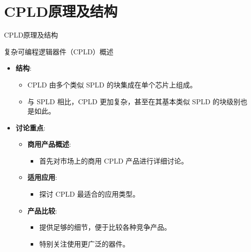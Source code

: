 \section{CPLD原理及结构}

\begin{frame}{CPLD原理及结构}
\begin{block}{复杂可编程逻辑器件（CPLD）概述}
\begin{itemize}
\tightlist
\item
    \textbf{结构}:

    \begin{itemize}
    \tightlist
    \item
    CPLD 由多个类似 SPLD 的块集成在单个芯片上组成。
    \item
    与 SPLD 相比，CPLD 更加复杂，甚至在其基本类似 SPLD
    的块级别也是如此。
    \end{itemize}
\item
    \textbf{讨论重点}:

    \begin{itemize}
    \tightlist
    \item
    \textbf{商用产品概述}:

    \begin{itemize}
    \tightlist
    \item
        首先对市场上的商用 CPLD 产品进行详细讨论。
    \end{itemize}
    \item
    \textbf{适用应用}:

    \begin{itemize}
    \tightlist
    \item
        探讨 CPLD 最适合的应用类型。
    \end{itemize}
    \item
    \textbf{产品比较}:

    \begin{itemize}
    \tightlist
    \item
        提供足够的细节，便于比较各种竞争产品。
    \item
        特别关注使用更广泛的器件。
    \end{itemize}
    \end{itemize}
\end{itemize}
\end{block}
\end{frame}

